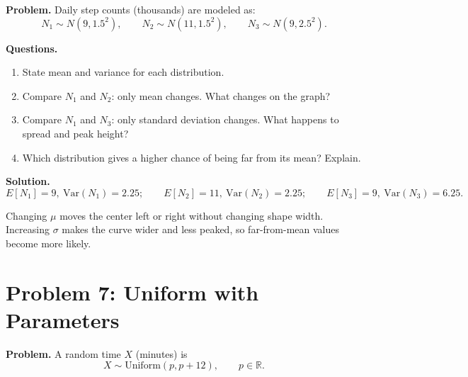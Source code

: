 \textbf{Problem.}
Daily step counts (thousands) are modeled as:
\[
N_1\sim N(9,1.5^2),\qquad N_2\sim N(11,1.5^2),\qquad N_3\sim N(9,2.5^2).
\]

\textbf{Questions.}
\begin{enumerate}
  \item State mean and variance for each distribution.
  \item Compare \(N_1\) and \(N_2\): only mean changes. What changes on the graph?
  \item Compare \(N_1\) and \(N_3\): only standard deviation changes. What happens to spread and peak height?
  \item Which distribution gives a higher chance of being far from its mean? Explain.
\end{enumerate}

\textbf{Solution.}
\[
E[N_1]=9,\ \mathrm{Var}(N_1)=2.25;
\qquad
E[N_2]=11,\ \mathrm{Var}(N_2)=2.25;
\qquad
E[N_3]=9,\ \mathrm{Var}(N_3)=6.25.
\]
\begin{center}
\end{center}
Changing \(\mu\) moves the center left or right without changing shape width. Increasing \(\sigma\) makes the curve wider and less peaked, so far-from-mean values become more likely.

\section{Problem 7: Uniform with Parameters}

\textbf{Problem.}
A random time \(X\) (minutes) is
\[
X\sim \text{Uniform}(p,p+12),\qquad p\in\mathbb{R}.
\]

